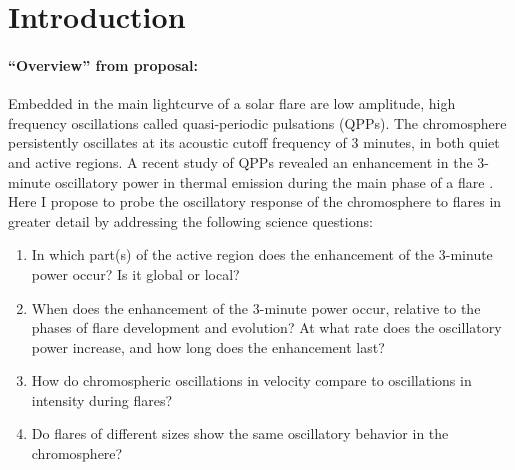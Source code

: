 \clearpage

\section{Introduction}

\paragraph{``Overview'' from proposal:}

Embedded in the main lightcurve of a solar flare are low amplitude, high
frequency oscillations called quasi-periodic pulsations (QPPs). The
chromosphere persistently oscillates at its acoustic cutoff frequency of 3
minutes, in both quiet and active regions. A recent study of QPPs revealed an
enhancement in the 3-minute oscillatory power in thermal emission during the
main phase of a flare \citep{Milligan2017}. Here I propose to probe the
oscillatory response of the chromosphere to flares in greater detail by
addressing the following science questions:
\begin{enumerate}
    \item In which part(s) of the active region does the enhancement of the
        3-minute power occur? Is it global or local?
    \item When does the enhancement of the 3-minute power occur, relative to
        the phases of flare development and evolution? At what rate does the
        oscillatory power increase, and how long does the enhancement last?
    \item How do chromospheric oscillations in velocity compare to oscillations
        in intensity during flares?
    \item Do flares of different sizes show the same oscillatory behavior in
        the chromosphere?
\end{enumerate}

